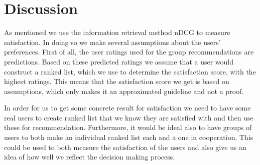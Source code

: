 \section{Discussion}\label{sec:conclusion_discussion}
As mentioned we use the information retrieval method nDCG to measure satisfaction. In doing so we make several assumptions about the users’ preferences. First of all, the user ratings used for the group recommendations are predictions. Based on these predicted ratings we assume that a user would construct a ranked list, which we use to determine the satisfaction score, with the highest ratings. This means that the satisfaction score we get is based on assumptions, which only makes it an approximated guideline and not a proof.

In order for us to get some concrete result for satisfaction we need to have some real users to create ranked list that we know they are satisfied with and then use these for recommendation. Furthermore, it would be ideal also to have groups of users to both make an individual ranked list each and a one in cooperation. This could be used to both measure the satisfaction of the users and also give us an idea of how well we reflect the decision making process.